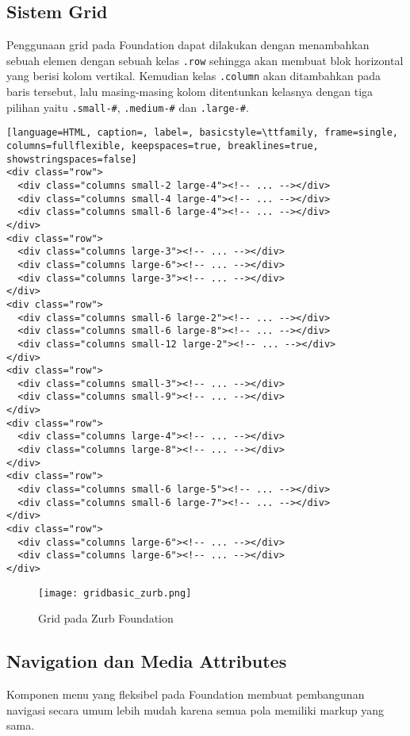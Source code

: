 \subsection{Sistem Grid}
Penggunaan grid pada Foundation dapat dilakukan dengan menambahkan sebuah elemen dengan sebuah kelas \texttt{.row} sehingga akan membuat blok horizontal yang berisi kolom vertikal. Kemudian kelas \texttt{.column} akan ditambahkan pada baris tersebut, lalu masing-masing kolom ditentunkan kelasnya dengan tiga pilihan yaitu 
\texttt{.small-\#}, \texttt{.medium-\#} dan \texttt{.large-\#}.
 
\begin{lstlisting}[language=HTML, caption=, label=, basicstyle=\ttfamily, frame=single, columns=fullflexible, keepspaces=true, breaklines=true, showstringspaces=false] 
<div class="row">
  <div class="columns small-2 large-4"><!-- ... --></div>
  <div class="columns small-4 large-4"><!-- ... --></div>
  <div class="columns small-6 large-4"><!-- ... --></div>
</div>
<div class="row">
  <div class="columns large-3"><!-- ... --></div>
  <div class="columns large-6"><!-- ... --></div>
  <div class="columns large-3"><!-- ... --></div>
</div>
<div class="row">
  <div class="columns small-6 large-2"><!-- ... --></div>
  <div class="columns small-6 large-8"><!-- ... --></div>
  <div class="columns small-12 large-2"><!-- ... --></div>
</div>
<div class="row">
  <div class="columns small-3"><!-- ... --></div>
  <div class="columns small-9"><!-- ... --></div>
</div>
<div class="row">
  <div class="columns large-4"><!-- ... --></div>
  <div class="columns large-8"><!-- ... --></div>
</div>
<div class="row">
  <div class="columns small-6 large-5"><!-- ... --></div>
  <div class="columns small-6 large-7"><!-- ... --></div>
</div>
<div class="row">
  <div class="columns large-6"><!-- ... --></div>
  <div class="columns large-6"><!-- ... --></div>
</div>
\end{lstlisting}

\begin{figure} [H]
	\centering  
	\texttt{[image: gridbasic\_zurb.png]}  
	\caption{Grid pada Zurb Foundation}	 
\end{figure}

\subsection{Navigation dan Media Attributes}
Komponen menu yang fleksibel pada Foundation membuat pembangunan navigasi secara umum lebih mudah karena semua pola memiliki markup yang sama.

